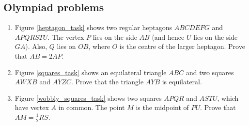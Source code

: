 \documentclass{article}
\begin{document}
  \subsection{Olympiad problems}
  \begin{enumerate}
    \item \label{heptagon_task_statement} Figure \ref{heptagon_task} shows two regular heptagons $ABCDEFG$ and $APQRSTU$. The vertex $P$ lies on the side $AB$ (and hence $U$ lies on the side $GA$). Also, $Q$ lies on $OB$, where $O$ is the centre of the larger heptagon. Prove that $AB = 2AP$.
    \item \label{squares_task_statement} Figure \ref{squares_task} shows an equilateral triangle $ABC$ and two squares $AWXB$ and $AYZC$. Prove that the triangle $AYB$ is equilateral.
    \item \label{wobbly_squares_task_statement} Figure \ref{wobbly_squares_task} shows two squares $APQR$ and $ASTU$, which have vertex $A$ in common. The point $M$ is the midpoint of $PU$. Prove that $AM = \frac{1}{2}RS$.


\end{enumerate}
\end{document}
